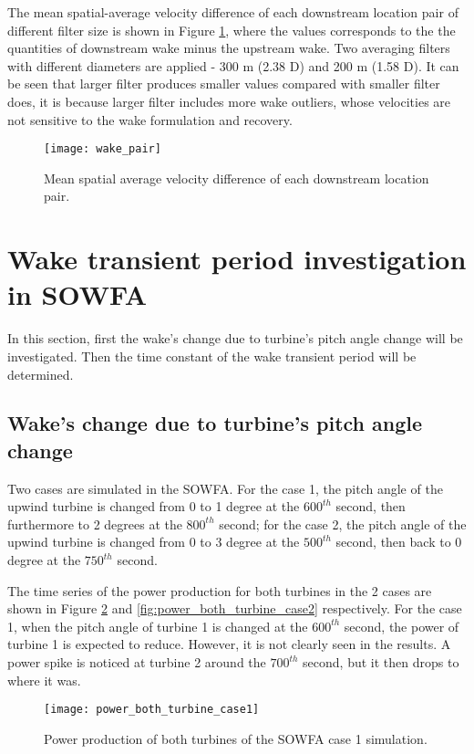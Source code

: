 \documentclass{umthesis}
\begin{document}
The mean spatial-average velocity difference of each downstream location pair of different filter size is shown in Figure \ref{fig:wake_pair}, where the values corresponds to the the quantities of downstream wake minus the upstream wake. Two averaging filters with different diameters are applied - 300 m (2.38 D) and 200 m (1.58 D). It can be seen that larger filter produces smaller values compared with smaller filter does, it is because larger filter includes more wake outliers, whose velocities are not sensitive to the wake formulation and recovery.

\begin{figure}
  \centering
  \texttt{[image: wake\_pair]}
  \caption{Mean spatial average velocity difference of each downstream location pair.}\label{fig:wake_pair}
\end{figure}


\section{Wake transient period investigation in SOWFA}\label{sec:SOWFA_transient}
In this section, first the wake's change due to turbine's pitch angle change will be investigated. Then the time constant of the wake transient period will be determined.

\subsection{Wake's change due to turbine's pitch angle change}
Two cases are simulated in the SOWFA. For the case 1, the pitch angle of the upwind turbine is changed from 0 to 1 degree at the $600^{th}$ second, then furthermore to 2 degrees at the $800^{th}$ second; for the case 2, the pitch angle of the upwind turbine is changed from 0 to 3 degree at the $500^{th}$ second, then back to 0 degree at the $750^{th}$ second. 

The time series of the power production for both turbines in the 2 cases are shown in Figure \ref{fig:power_both_turbine_case1} and \ref{fig:power_both_turbine_case2} respectively. For the case 1, when the pitch angle of turbine 1 is changed at the $600^{th}$ second, the power of turbine 1 is expected to reduce. However, it is not clearly seen in the results. A power spike is noticed at turbine 2 around the $700^{th}$ second, but it then drops to where it was. 

\begin{figure}
  \centering
  \texttt{[image: power\_both\_turbine\_case1]}
  \caption{Power production of both turbines of the SOWFA case 1 simulation.}\label{fig:power_both_turbine_case1}
\end{figure}
\end{document}
